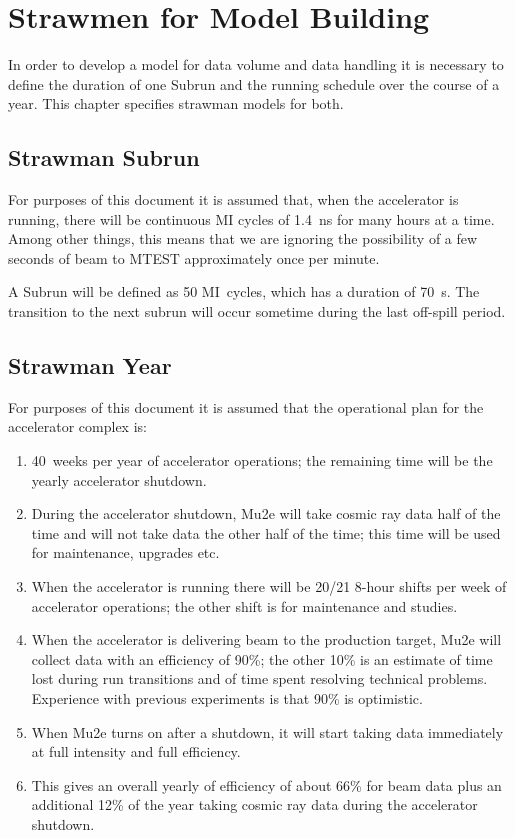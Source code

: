 \chapter{Strawmen for Model Building}
\label{ch:strawmen}

In order to develop a model for data volume and data handling it is necessary
to define the duration of one Subrun and the running schedule over the course
of a year.  This chapter specifies strawman models for both.

\section{Strawman Subrun}
\label{sec:strawmanSubrun}

For purposes of this document it is assumed that,
when the accelerator is running,
there will be continuous MI cycles of 1.4~ns for many hours at a time.
Among other things, this means that we are ignoring the possibility of
a few seconds of beam to MTEST approximately once per minute.

A Subrun will be defined as 50 MI~cycles, which has a duration of 70~s.
The transition to the next subrun will occur sometime during the
last off-spill period.

\section{Strawman Year}
\label{sec:strawmanYear}

For purposes of this document it is assumed that the operational plan for
the accelerator complex is:
\begin{enumerate}
  \item 40~weeks per year of accelerator operations; the remaining time will be the yearly accelerator shutdown.
  \item During the accelerator shutdown, Mu2e will take cosmic ray data half of the time
    and will not take data the other half of the time; this time will be used for maintenance, upgrades etc.
  \item When the accelerator is running there will be 20/21 8-hour shifts per week of accelerator operations;
    the other shift is for maintenance and studies.
  \item When the accelerator is delivering beam to the production target, Mu2e will collect data with an
    efficiency of 90\%;
    the other 10\% is an estimate of time lost during run transitions and of time spent resolving technical problems.
    Experience with previous experiments is that 90\% is optimistic.
  \item When Mu2e turns on after a shutdown, it will start taking data immediately at full intensity and full efficiency.
  \item This gives an overall yearly of efficiency of about 66\% for beam data plus an additional 12\% of the year taking
    cosmic ray data during the accelerator shutdown.
\end{enumerate}

